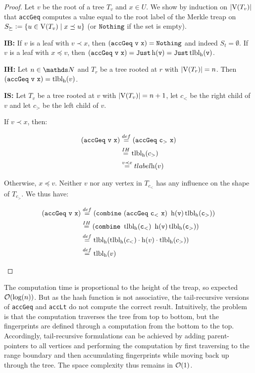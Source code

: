 \begin{proof}
Let $v$ be the root of a tree $T_v$ and $x \in U$. We show by induction on $|{\operatorname{V}(T_v)}|$ that \texttt{accGeq} computes a value equal to the root label of the Merkle treap on $S_{\succeq} \vcentcolon= \{u \in \operatorname{V}(T_v) \mid x \preceq u\}$ (or $\mathtt{Nothing}$ if the set is empty).

\textbf{IB:} If $v$ is a leaf with $v \prec x$, then $\mathtt{(accGeq\ v\ x)} = \mathtt{Nothing}$ and indeed $S_{t} = \emptyset$. If $v$ is a leaf with $x \preceq v$, then $\mathtt{(accGeq\ v\ x)} =  \mathtt{Just \operatorname{h}(v)} = \mathtt{Just \operatorname{tlbl_{\operatorname{h}}}(v)}$.

\textbf{IH:} Let  $n \in \N$ and $T_r$ be a tree rooted at $r$ with $|{\operatorname{V}(T_r)}| = n$. Then $\mathtt{(accGeq\ v\ x)} = \operatorname{tlbl_{\operatorname{h}}}(v)$.

\textbf{IS:} Let $T_v$ be a tree rooted at $v$ with $|{\operatorname{V}(T_v)}| = n + 1$, let $c_{<}$ be the right child of $v$  and let $c_
{>}$ be the left child of $v$.

\begin{caselist}
\case If $v \prec x$, then:

\begin{align*}
\mathtt{(accGeq\ v\ x)} &\overset{def}= \mathtt{(accGeq\ c_{>}\ x)}\\
&\overset{IH}= \tlabel{\h}(c_{>})\\
&\overset{v \prec x}= tlabel{\h}(v)\\
\end{align*}

\case Otherwise, $x \preceq v$. Neither $v$ nor any vertex in $T_{c_{<}}$ has any influence on the shape of $T_{c_{>}}$. We thus have:

\begin{align*}
\mathtt{(accGeq\ v\ x)} &\overset{def}= \mathtt{(combine\ (accGeq\ c_{<}\ x)\ \h(v) \tlabel{\h}(c_{>}))}\\
&\overset{IH}= \mathtt{(combine\ \tlabel{\h}(c_{<})\ \h(v) \tlabel{\h}(c_{>}))}\\
&\overset{def}= \tlabel{\h}(\tlabel{\h}(c_{<}) \concatenate \h(v) \concatenate \tlabel{\h}(c_{>}))\\
&\overset{def}= \tlabel{\h}(v)\\
\end{align*}
\end{caselist}
\end{proof}

The computation time is proportional to the height of the treap, so expected $\mathcal{O}(\log(n))$. But as the hash function is not associative, the tail-recursive versions of \texttt{accGeq} and \texttt{accLt} do not compute the correct result. Intuitively, the problem is that the computation traverses the tree from top to bottom, but the fingerprints are defined through a computation from the bottom to the top. Accordingly, tail-recursive formulations can be achieved by adding parent-pointers to all vertices and performing the computation by first traversing to the range boundary and then accumulating fingerprints while moving back up through the tree. The space complexity thus remains in $\mathcal{O}(1)$.

